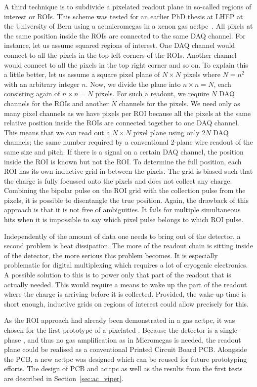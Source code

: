 A third technique is to subdivide a pixelated readout plane in so-called regions of interest or ROIs.
This scheme was tested for an earlier PhD thesis at LHEP at the University of Bern using a \gls{ac:micromegas} in a xenon gas \gls{ac:tpc}~\cite{maplesyrup}.
All pixels at the same position inside the ROIs are connected to the same DAQ channel.
For instance, let us assume squared regions of interest.
One DAQ channel would connect to all the pixels in the top left corners of the ROIs.
Another channel would connect to all the pixels in the top right corner and so on.
To explain this a little better, let us assume a square pixel plane of $N \times N$ pixels where $N = n ^ 2$ with an arbitrary integer $n$.
Now, we divide the plane into $n \times n = N$, each consisting again of $n \times n = N$ pixels.
For such a readout, we require $N$ DAQ channels for the ROIs and another $N$ channels for the pixels.
We need only as many pixel channels as we have pixels per ROI because all the pixels at the same relative position inside the ROIs are connected together to one DAQ channel.
This means that we can read out a $N \times N$ pixel plane using only $2 N$ DAQ channels; the same number required by a conventional 2-plane wire readout of the same size and pitch.
If there is a signal on a certain DAQ channel, the position inside the ROI is known but not the ROI.
To determine the full position, each ROI has its own inductive grid in between the pixels.
The grid is biased such that the charge is fully focussed onto the pixels and does not collect any charge.
Combining the bipolar pulse on the ROI grid with the collection pulse from the pixels, it is possible to disentangle the true position.
Again, the drawback of this approach is that it is not free of ambiguities.
It fails for multiple simultaneous hits when it is impossible to say which pixel pulse belongs to which ROI pulse.

Independently of the amount of data one needs to bring out of the detector, a second problem is heat dissipation.
The more of the readout chain is sitting inside of the detector, the more serious this problem becomes.
It is especially problematic for digital multiplexing which requires a lot of cryogenic electronics.
A possible solution to this is to power only that part of the readout that is actually needed.
This would require a means to wake up the part of the readout where the charge is arriving before it is collected.
Provided, the wake-up time is short enough, inductive grids on regions of interest could allow precisely for this.

As the ROI approach had already been demonstrated in a gas \gls{ac:tpc}, it was chosen for the first prototype of a pixelated \lartpc{}.
Because the detector is a single-phase \lartpc{}, and thus no gas amplification as in Micromegas is needed, the readout plane could be realised as a conventional Printed Circuit Board PCB.
Alongside the PCB, a new \gls{ac:tpc} was designed which can be reused for future prototyping efforts.
The design of PCB and \gls{ac:tpc} as well as the results from the first tests are described in Section~\ref{sec:ac_viper}.

\afterpage{\clearpage}
